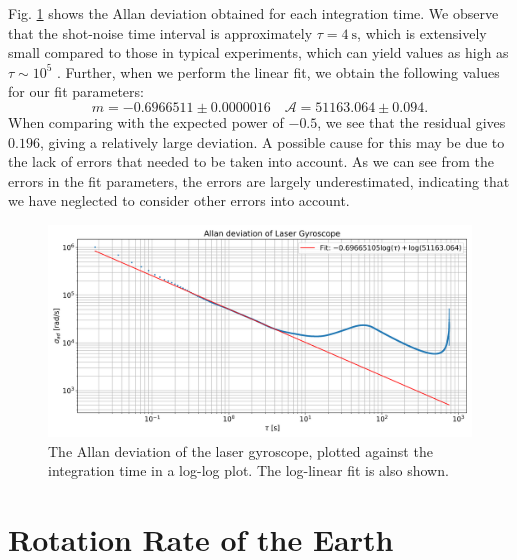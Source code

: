 \documentclass[a4paper]{report}
\numberwithin{equation}{section}
\begin{document}
Fig. \ref{fig:allan} shows the Allan deviation obtained for each integration time.
We observe that the shot-noise time interval is approximately $\tau = \SI{4}{\second}$, which is extensively small 
compared to those in typical experiments, which can yield values as high as $\tau \sim 10^{5}$ \cite{Groh2021}. 
Further, when we perform the linear fit, we obtain the following values for our fit parameters: 
\begin{equation}
	m = -0.6966511 \pm 0.0000016 \quad \mathcal{A} = 51163.064 \pm 0.094. 
\end{equation}
When comparing with the expected power of $-0.5$, we see that the residual gives $0.196$, giving a relatively large deviation. 
A possible cause for this may be due to the lack of errors that needed to be taken into account. As we can see from the errors in 
the fit parameters, the errors are largely underestimated, indicating that we have neglected to consider other errors into account. 



\begin{figure}[h!]
	\centering
	\includegraphics[width=0.8\columnwidth]{allan.png}
	\caption{The Allan deviation of the laser gyroscope, plotted against the integration time in a log-log plot. The log-linear fit
	is also shown.}
	\label{fig:allan}
\end{figure}



\section{Rotation Rate of the Earth}
\end{document}
